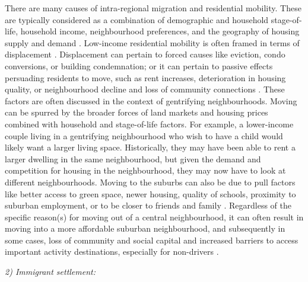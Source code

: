 There are many causes of intra-regional migration and residential mobility. These are typically considered as a combination of demographic and household stage-of-life, household income, neighbourhood preferences, and the geography of housing supply and demand \cite{lee_neighborhood_1994,morrow-jones_housing_2005,schwanen_what_2005}. Low-income residential mobility is often framed in terms of displacement \cite{atkinson_measuring_2000,freeman_displacement_2005,zuk_gentrification_2018}. Displacement can pertain to forced causes like eviction, condo conversions, or building condemnation; or it can pertain to passive effects persuading residents to move, such as rent increases, deterioration in housing quality, or neighbourhood decline and loss of community connections \cite{zuk_gentrification_2018}. These factors are often discussed in the context of gentrifying neighbourhoods. Moving can be spurred by the broader forces of land markets and housing prices combined with household and stage-of-life factors. For example, a lower-income couple living in a gentrifying neighbourhood who wish to have a child would likely want a larger living space. Historically, they may have been able to rent a larger dwelling in the same neighbourhood, but given the demand and competition for housing in the neighbourhood, they may now have to look at different neighbourhoods. Moving to the suburbs can also be due to pull factors like better access to green space, newer housing, quality of schools, proximity to suburban employment, or to be closer to friends and family \cite{lee_neighborhood_1994,kim_intrametropolitan_2011,spring_influence_2017}. Regardless of the specific reason(s) for moving out of a central neighbourhood, it can often result in moving into a more affordable suburban neighbourhood, and subsequently in some cases, loss of community and social capital \cite{august_challenging_2014} and increased barriers to access important activity destinations, especially for non-drivers \cite{allen_planning_2020}.





\textit{2) Immigrant settlement:}

